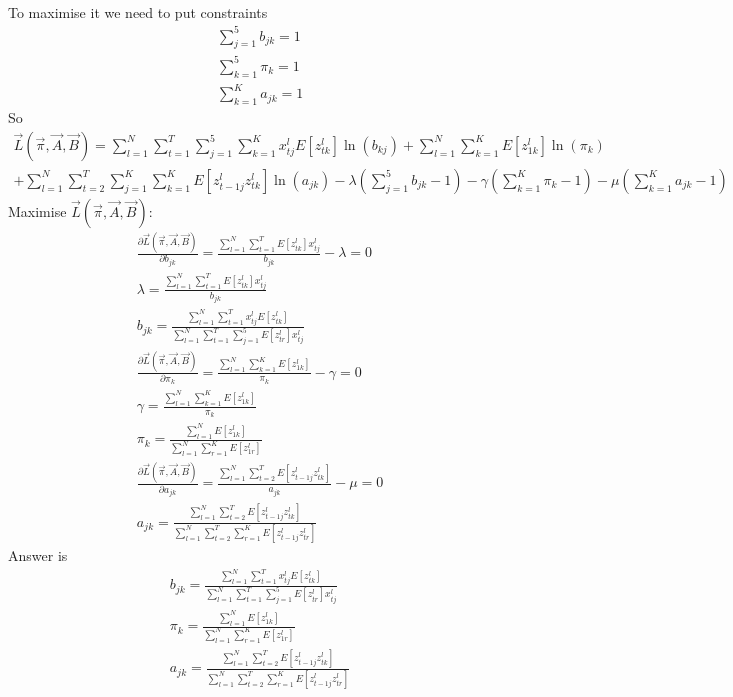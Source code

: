 \documentclass[12pt,twoside]{article}
\begin{document}
\begin{enumerate}[(i)]
\begin{align}
\end{align}
To maximise it we need to put constraints
\begin{align}
\sum_{j=1}^{5} b_{jk} = 1\\
\sum_{k=1}^{5} \pi_k = 1\\
\sum_{k=1}^{K} a_{jk} = 1
\end{align}
So
\begin{align}
\vec{L}(\vec{\pi}, \vec{A} , \vec{B}) =  \sum_{l=1}^{N} \sum_{t=1}^{T} \sum_{j=1}^5 \sum_{k=1}^K x_{tj}^l E[z_{tk}^l] \ln (b_{kj})  + \sum_{l=1}^{N} \sum_{k=1}^K E[z_{1k}^l] \ln (\pi_k) \\
+ \sum_{l=1}^{N} \sum_{t=2}^{T} \sum_{j=1}^K \sum_{k=1}^K E[z_{t-1j}^l  z_{tk}^l] \ln (a_{jk}) - \lambda (  \sum_{j=1}^{5} b_{jk} -1 ) - \gamma (\sum_{k=1}^{K} \pi_k - 1) - \mu (\sum_{k=1}^{K} a_{jk} - 1)
\end{align}
Maximise $\vec{L}(\vec{\pi},\vec{A},\vec{B})$:
\begin{align}
\frac{\partial \vec{L}(\vec{\pi}, \vec{A}, \vec{B})}{\partial  b_{jk}} = \frac{\sum_{l=1}^{N} \sum_{t=1}^{T} E[z_{tk}^l] x_{tj}^l}{b_{jk}} - \lambda = 0 \\
\lambda = \frac{\sum_{l=1}^{N} \sum_{t=1}^{T} E[z_{tk}^l] x_{tj}^l}{b_{jk}} \\
b_{jk} = \frac{\sum_{l=1}^{N} \sum_{t=1}^{T} x_{tj}^l E[z_{tk}^l]}{\sum_{l=1}^{N} \sum_{t=1}^{T} \sum_{j=1}^5 E[z_{tr}^l] x_{tj}^l}\\
\frac{\partial \vec{L}(\vec{\pi}, \vec{A}, \vec{B})}{\partial  \pi_k} = \frac{\sum_{l=1}^{N} \sum_{k=1}^K E[z_{1k}^l] }{\pi_k}- \gamma = 0\\ 
\gamma = \frac{\sum_{l=1}^{N} \sum_{k=1}^K E[z_{1k}^l] }{\pi_k} \\
\pi_k = \frac{\sum_{l=1}^{N} E[z_{1k}^l]}{\sum_{l=1}^{N} \sum_{r=1}^K E[z_{1r}^l]} \\
\frac{\partial \vec{L}(\vec{\pi}, \vec{A}, \vec{B})}{\partial  a_{jk}} =  \frac{\sum_{l=1}^{N} \sum_{t=2}^{T} E[z_{t-1j}^l  z_{tk}^l]}{a_{jk}}- \mu = 0\\
a_{jk} = \frac{\sum_{l=1}^{N} \sum_{t=2}^{T} E[z_{t-1j}^l  z_{tk}^l]}{\sum_{l=1}^{N} \sum_{t=2}^{T} \sum_{r=1}^K E[z_{t-1j}^l  z_{tr}^l]} 
\end{align}
Answer is
\begin{align}
b_{jk} = \frac{\sum_{l=1}^{N} \sum_{t=1}^{T} x_{tj}^l E[z_{tk}^l]}{\sum_{l=1}^{N} \sum_{t=1}^{T} \sum_{j=1}^5 E[z_{tr}^l] x_{tj}^l}\\
\pi_k = \frac{\sum_{l=1}^{N} E[z_{1k}^l]}{\sum_{l=1}^{N} \sum_{r=1}^K E[z_{1r}^l]} \\
a_{jk} = \frac{\sum_{l=1}^{N} \sum_{t=2}^{T} E[z_{t-1j}^l  z_{tk}^l]}{\sum_{l=1}^{N} \sum_{t=2}^{T} \sum_{r=1}^K E[z_{t-1j}^l  z_{tr}^l]}
\end{align}

\end{enumerate}
\end{document}

